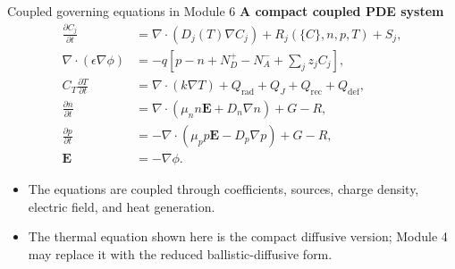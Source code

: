 \documentclass[aspectratio=169,10pt]{beamer}
\begin{document}
\begin{frame}{Coupled governing equations in Module 6}
\footnotesize
\textbf{A compact coupled PDE system}
\vspace{-0.25em}
\begin{align*}
\frac{\partial C_j}{\partial t}
&=\nabla\cdot(D_j(T)\nabla C_j)+R_j(\{C\},n,p,T)+S_j,\\[-0.1em]
\nabla\cdot(\epsilon\nabla\phi)
&=-q\left[p-n+N_D^+-N_A^-+\sum_j z_jC_j\right],\\[-0.1em]
C_T\frac{\partial T}{\partial t}
&=\nabla\cdot(k\nabla T)+Q_{\mathrm{rad}}+Q_J+Q_{\mathrm{rec}}+Q_{\mathrm{def}},\\[-0.1em]
\frac{\partial n}{\partial t}
&=\nabla\cdot(\mu_n n\mathbf E+D_n\nabla n)+G-R,\\[-0.1em]
\frac{\partial p}{\partial t}
&=-\nabla\cdot(\mu_p p\mathbf E-D_p\nabla p)+G-R,\\[-0.1em]
\mathbf E&=-\nabla\phi.
\end{align*}

\vspace{-0.3em}
\begin{itemize}
    \item The equations are coupled through coefficients, sources, charge density, electric field, and heat generation.
    \item The thermal equation shown here is the compact diffusive version; Module 4 may replace it with the reduced ballistic-diffusive form.
\end{itemize}
\end{frame}
\end{document}
